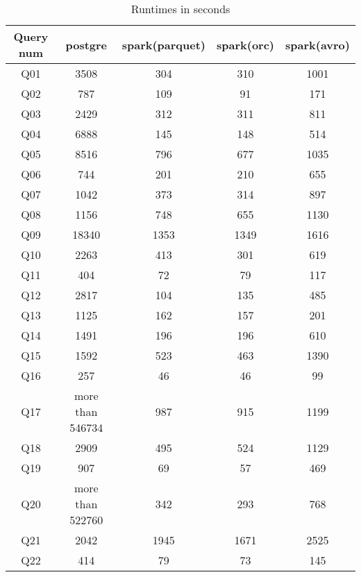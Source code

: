 \documentclass[../main.tex]{subfiles}
\begin{document}
    \begin{table}
        \begin{center}
            \begin{tabular}{ |c|c|c|c|c| } 
            \hline
            Query num & postgre & spark(parquet) & spark(orc) & spark(avro)\\
            \hline
            Q01 & 3508 & 304 & 310 & 1001\\
            Q02 & 787 & 109 & 91 & 171\\
            Q03 & 2429 & 312 & 311 & 811\\
            Q04 & 6888 & 145 & 148 & 514\\
            Q05 & 8516 & 796 & 677 & 1035\\
            Q06 & 744 & 201 & 210 & 655\\
            Q07 & 1042 & 373 & 314 & 897\\
            Q08 & 1156 & 748 & 655 & 1130\\
            Q09 & 18340 & 1353 & 1349 & 1616\\
            Q10 & 2263 & 413 & 301 & 619\\
            Q11 & 404 & 72 & 79 & 117\\
            Q12 & 2817 & 104 & 135 & 485\\
            Q13 & 1125 & 162 & 157 & 201\\
            Q14 & 1491 & 196 & 196 & 610\\
            Q15 & 1592 & 523 & 463 & 1390\\
            Q16 & 257 & 46 & 46 & 99\\
            Q17 & more than 546734 & 987 & 915 & 1199\\
            Q18 & 2909 & 495 & 524 & 1129\\
            Q19 & 907 & 69 & 57 & 469\\
            Q20 & more than 522760 & 342 & 293 & 768\\
            Q21 & 2042 & 1945 & 1671 & 2525\\
            Q22 & 414 & 79 & 73 & 145\\
            \hline
            \end{tabular}
            \\[1pt]
            \caption{Runtimes in seconds}
        \end{center}
    \end{table}
\end{document}
